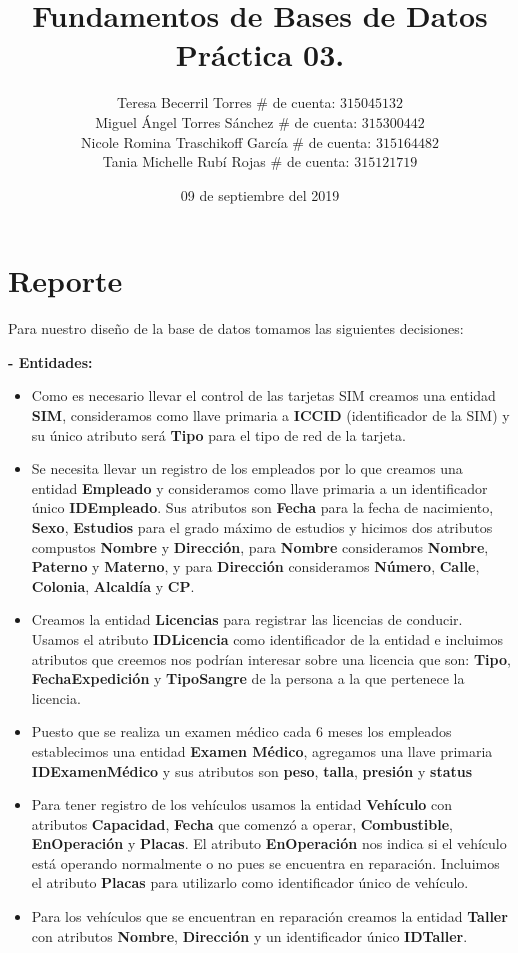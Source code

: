 \documentclass[letterpaper,11pt]{article}
\title{Fundamentos de Bases de Datos \\
       Práctica 03. }
\author{Teresa Becerril Torres
        $\#$ de cuenta: $315045132$ \\
        Miguel Ángel Torres Sánchez
        $\#$ de cuenta: $315300442$ \\
        Nicole Romina Traschikoff García
        $\#$ de cuenta: $315164482$ \\
        Tania Michelle Rubí Rojas
        $\#$ de cuenta: $315121719$}
\date{09 de septiembre del 2019}
\begin{document}
\maketitle

\section{Reporte}
Para nuestro diseño de la base de datos tomamos las siguientes decisiones:

\textbf{- Entidades: }
\begin{itemize}
\item Como es necesario llevar el control de las tarjetas SIM  
      creamos una entidad \textbf{SIM}, consideramos como llave 
      primaria a \textbf{ICCID} (identificador de la SIM) y su 
      único atributo será \textbf{Tipo} para el tipo de red de 
      la tarjeta. 
\item Se necesita llevar un registro de los empleados por lo que 
      creamos una entidad \textbf{Empleado} y consideramos como 
      llave primaria a un identificador único \textbf{IDEmpleado}.
      Sus atributos son \textbf{Fecha} para la fecha de nacimiento, 
      \textbf{Sexo}, \textbf{Estudios} para el grado máximo de estudios y 
      hicimos dos atributos compustos \textbf{Nombre} y \textbf{Dirección}, 
      para \textbf{Nombre} consideramos \textbf{Nombre}, 
      \textbf{Paterno} y \textbf{Materno}, y para \textbf{Dirección} 
      consideramos \textbf{Número}, \textbf{Calle}, \textbf{Colonia},
      \textbf{Alcaldía} y \textbf{CP}.
\item Creamos la entidad  \textbf{Licencias} para registrar las licencias de conducir. Usamos el atributo  \textbf{IDLicencia} como identificador de la entidad e incluimos atributos que creemos nos podrían interesar sobre una licencia que son:  \textbf{Tipo},  \textbf{FechaExpedición} y  \textbf{TipoSangre} de la persona a la que pertenece la licencia.
\item Puesto que se realiza un examen médico cada 6 meses los empleados
      establecimos una entidad \textbf{Examen Médico}, agregamos 
      una llave primaria \textbf{IDExamenMédico} y sus atributos 
      son \textbf{peso}, \textbf{talla}, \textbf{presión} y \textbf{status}
\item Para tener registro de los vehículos usamos la entidad \textbf{Vehículo} con atributos \textbf{Capacidad},  \textbf{Fecha} que comenzó a operar, \textbf{Combustible},  \textbf{EnOperación} y  \textbf{Placas}. El atributo  \textbf{EnOperación} nos indica si el vehículo está operando normalmente o no pues se encuentra en reparación. Incluimos el atributo  \textbf{Placas} para utilizarlo como identificador único de vehículo.
\item Para los vehículos que se encuentran en reparación creamos la entidad \textbf{Taller} con atributos \textbf{Nombre}, \textbf{Dirección} y un identificador único \textbf{IDTaller}.      
\end{itemize}
\end{document}
